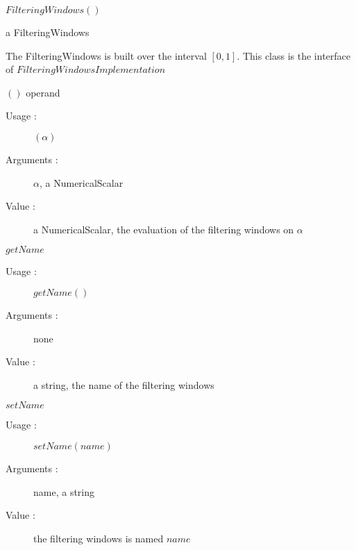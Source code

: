 \begin{description}

\item[Usage :] \rule{0pt}{1em}
  \begin{description}
  \item $FilteringWindows()$
  \end{description}
  \bigskip


\item[Value :] a FilteringWindows
  \rule{0pt}{1em}
  \begin{description}
  \item The FilteringWindows is built over the interval $[0, 1]$. This class is the interface of $FilteringWindowsImplementation$
  \end{description}
  \bigskip

\item[Some methods :]  \rule{0pt}{1em}

  \begin{description}

    \item $()$ operand
    \begin{description}
    \item[Usage :] $(\alpha)$
    \item[Arguments :] $\alpha$, a NumericalScalar
    \item[Value :]  a NumericalScalar, the evaluation of the filtering windows on $\alpha$
    \end{description}
    \bigskip

    \item $getName$
    \begin{description}
    \item[Usage :] $getName()$
    \item[Arguments :] none
    \item[Value :]  a string, the name of the filtering windows
    \end{description}
    \bigskip

    \item $setName$
    \begin{description}
    \item[Usage :] $setName(name)$
    \item[Arguments :] name, a string
    \item[Value :]  the filtering windows is named $name$
    \end{description}
    \bigskip

  \end{description}


\end{description}

